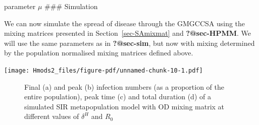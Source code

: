\documentclass[
  letterpaper,
  DIV=11,
  numbers=noendperiod]{scrartcl}
\begin{document}
parameter \(\mu\) \#\#\# Simulation

We can now simulate the spread of disease through the GMGCCSA using the
mixing matrices presented in Section~\ref{sec-SAmixmat} and
\textbf{?@sec-HPMM}. We will use the same parameters as in
\textbf{?@sec-sim}, but now with mixing determined by the population
normalised mixing matrices defined above.

\texttt{[image: Hmods2\_files/figure-pdf/unnamed-chunk-10-1.pdf]}

\begin{figure}

\begin{minipage}[t]{0.50\linewidth}

{\centering 


}

\subcaption{\label{fig-SA3_OD_outcomes-1}}
\end{minipage}%
%
\begin{minipage}[t]{0.50\linewidth}

{\centering 


}

\subcaption{\label{fig-SA3_OD_outcomes-2}}
\end{minipage}%
\newline
\begin{minipage}[t]{0.50\linewidth}

{\centering 


}

\subcaption{\label{fig-SA3_OD_outcomes-3}}
\end{minipage}%
%
\begin{minipage}[t]{0.50\linewidth}

{\centering 


}

\subcaption{\label{fig-SA3_OD_outcomes-4}}
\end{minipage}%

\caption{\label{fig-SA3_OD_outcomes}Final (a) and peak (b) infection
numbers (as a proportion of the entire population), peak time (c) and
total duration (d) of a simulated SIR metapopulation model with OD
mixing matrix at different values of \(\delta^H\) and \(R_0\)}

\end{figure}
\end{document}
